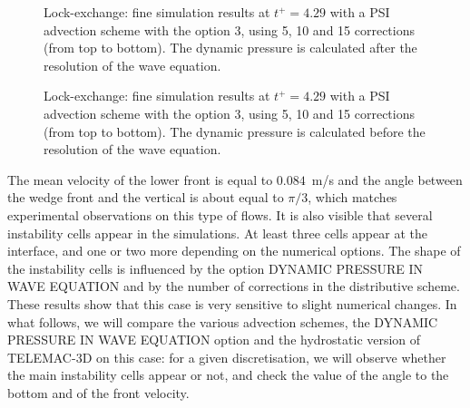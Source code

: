 \begin{figure}[ht]
  \begin{center}
    \caption{Lock-exchange: fine simulation results at $t^+=4.29$ with a PSI advection scheme
      with the option 3, using 5, 10 and 15 corrections (from top to bottom).
      The dynamic pressure is calculated after the resolution of the wave equation.}
    \label{fig:fine_sim}
  \end{center}
\end{figure}
\begin{figure}[ht]
  \begin{center}
    \caption{Lock-exchange: fine simulation results at $t^+=4.29$ with a PSI advection scheme
      with the option 3, using 5, 10 and 15 corrections (from top to bottom).
      The dynamic pressure is calculated before the resolution of the wave equation.}
    \label{fig:fine_sim_dpwaveq}
  \end{center}
\end{figure}

The mean velocity of the lower front is equal to $0.084$~m/s and the angle between the wedge front and the
vertical is about equal to $\pi/3$, which matches experimental observations on this type of flows.
It is also visible that several instability cells appear in the simulations. At least three cells appear at the interface,
and one or two more depending on the numerical options.
The shape of the instability cells is influenced by the option DYNAMIC PRESSURE IN WAVE EQUATION
and by the number of corrections in the distributive scheme.
These results show that this case is very sensitive to slight numerical changes.
In what follows, we will compare the various advection schemes, the DYNAMIC PRESSURE IN WAVE EQUATION option and
the hydrostatic version of TELEMAC-3D on this case: for a given discretisation, we will observe whether the
main instability cells appear or not, and check the value of the angle to the bottom and of the front velocity.
%
%
%

